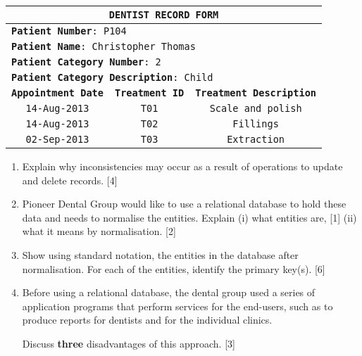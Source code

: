 \noindent \begin{center}
\begin{tabular}{|c|c|c|}
\hline 
\multicolumn{3}{|c|}{\texttt{\textbf{DENTIST RECORD FORM}}}\tabularnewline
\hline 
\multicolumn{3}{|l|}{\texttt{\textbf{Patient Number}}\texttt{: P104}}\tabularnewline
\multicolumn{3}{|l|}{\texttt{\textbf{Patient Name}}\texttt{: Christopher Thomas}}\tabularnewline
\multicolumn{3}{|l|}{\texttt{\textbf{Patient Category Number}}\texttt{: 2}}\tabularnewline
\multicolumn{3}{|l|}{\texttt{\textbf{Patient Category Description}}\texttt{: Child }}\tabularnewline
\hline 
\texttt{\textbf{Appointment Date}} & \texttt{\textbf{Treatment ID}} & \texttt{\textbf{Treatment Description}}\tabularnewline
\hline 
\texttt{14-Aug-2013} & \texttt{T01} & \texttt{Scale and polish}\tabularnewline
\hline 
\texttt{14-Aug-2013} & \texttt{T02} & \texttt{Fillings}\tabularnewline
\hline 
\texttt{02-Sep-2013} & \texttt{T03} & \texttt{Extraction}\tabularnewline
\hline 
\end{tabular}
\par\end{center}
\begin{enumerate}
\item Explain why inconsistencies may occur as a result of operations to
update and delete records. \hfill{}{[}4{]}
\item Pioneer Dental Group would like to use a relational database to hold
these data and needs to normalise the entities. Explain (i) what entities
are, {[}1{]} (ii) what it means by normalisation. \hfill{}{[}2{]}
\item Show using standard notation, the entities in the database after normalisation.
For each of the entities, identify the primary key(s). \hfill{} {[}6{]}
\item Before using a relational database, the dental group used a series
of application programs that perform services for the end-users, such
as to produce reports for dentists and for the individual clinics.

Discuss \textbf{three} disadvantages of this approach. \hfill{} {[}3{]}
\end{enumerate}